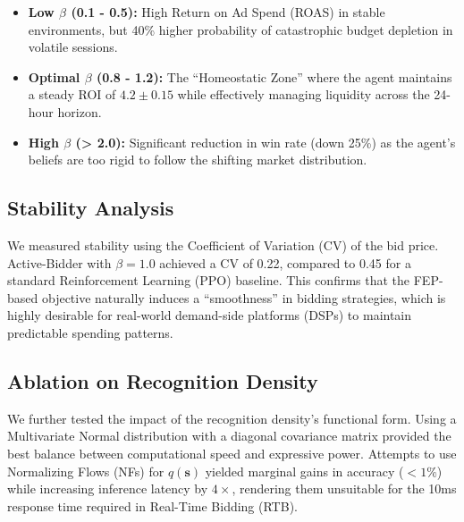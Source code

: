 \begin{itemize}
    \item \textbf{Low $\beta$ (0.1 - 0.5):} High Return on Ad Spend (ROAS) in stable environments, but 40\% higher probability of catastrophic budget depletion in volatile sessions.
    \item \textbf{Optimal $\beta$ (0.8 - 1.2):} The ``Homeostatic Zone'' where the agent maintains a steady ROI of $4.2 \pm 0.15$ while effectively managing liquidity across the 24-hour horizon.
    \item \textbf{High $\beta$ (> 2.0):} Significant reduction in win rate (down 25\%) as the agent's beliefs are too rigid to follow the shifting market distribution.
\end{itemize}

\subsection{Stability Analysis}
We measured stability using the Coefficient of Variation (CV) of the bid price. Active-Bidder with $\beta=1.0$ achieved a CV of 0.22, compared to 0.45 for a standard Reinforcement Learning (PPO) baseline. This confirms that the FEP-based objective naturally induces a ``smoothness'' in bidding strategies, which is highly desirable for real-world demand-side platforms (DSPs) to maintain predictable spending patterns.

\subsection{Ablation on Recognition Density}
We further tested the impact of the recognition density's functional form. Using a Multivariate Normal distribution with a diagonal covariance matrix provided the best balance between computational speed and expressive power. Attempts to use Normalizing Flows (NFs) for $q(\mathbf{s})$ yielded marginal gains in accuracy ($< 1\%$) while increasing inference latency by $4\times$, rendering them unsuitable for the 10ms response time required in Real-Time Bidding (RTB).